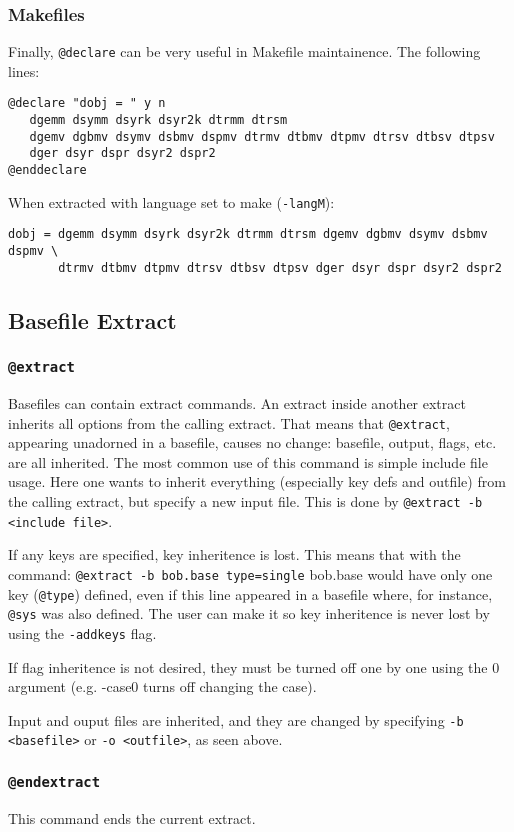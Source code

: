 \subsubsection{Makefiles}
Finally, {\tt @declare} can be very useful in Makefile maintainence.
The following lines:
\begin{verbatim}
@declare "dobj = " y n
   dgemm dsymm dsyrk dsyr2k dtrmm dtrsm 
   dgemv dgbmv dsymv dsbmv dspmv dtrmv dtbmv dtpmv dtrsv dtbsv dtpsv
   dger dsyr dspr dsyr2 dspr2
@enddeclare
\end{verbatim}
When extracted with language set to make ({\tt -langM}):
\begin{verbatim}
dobj = dgemm dsymm dsyrk dsyr2k dtrmm dtrsm dgemv dgbmv dsymv dsbmv dspmv \
       dtrmv dtbmv dtpmv dtrsv dtbsv dtpsv dger dsyr dspr dsyr2 dspr2
\end{verbatim}
\subsection{Basefile Extract}
\subsubsection{{\tt @extract}}
Basefiles can contain extract commands.  An extract inside another extract
inherits all options from the calling extract.  That means that
{\tt @extract}, appearing unadorned in a basefile, causes no change: 
basefile, output, flags, etc. are all inherited.  The most common use
of this command is simple include file usage.  Here one wants to inherit
everything (especially key defs and outfile) from the calling extract, but
specify a new input file.  This is done by {\tt @extract -b <include file>}.

If any keys are specified, key inheritence is lost.  This means that
with the command: {\tt @extract -b bob.base type=single} bob.base
would have only one key ({\tt @type}) defined,
even if this line appeared in a basefile where, for instance, {\tt @sys}
was also defined.  The user can make it so key inheritence is never lost
by using the {\tt -addkeys} flag.

If flag inheritence is not desired, they must be turned off one by one
using the 0 argument (e.g. -case0 turns off changing the case).

Input and ouput files are inherited, and they are changed by specifying
{\tt -b <basefile>} or {\tt -o <outfile>}, as seen above.

\subsubsection{{\tt @endextract}}
This command ends the current extract.


